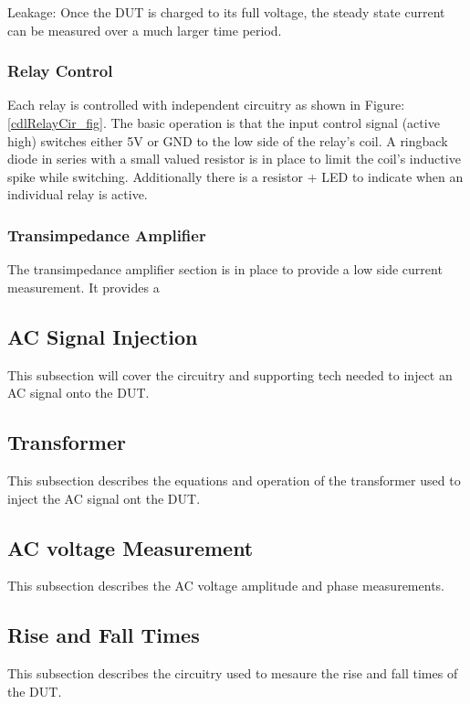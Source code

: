 Leakage:
Once the DUT is charged to its full voltage, the steady state current can be measured over a much larger time period.

\subsubsection{Relay Control}

Each relay is controlled with independent circuitry as shown in Figure: \ref{cdlRelayCir_fig}. The basic operation is that the input control signal (active high) switches either 5V or GND to the low side of the relay's coil. A ringback diode in series with a small valued resistor is in place to limit the coil's inductive spike while switching. Additionally there is a resistor + LED to indicate when an individual relay is active.

\subsubsection{Transimpedance Amplifier}
The transimpedance amplifier section is in place to provide a low side current measurement. It provides a 


\subsection {AC Signal Injection}

This subsection will cover the circuitry and supporting tech needed to inject an AC signal onto the DUT.

\subsection {Transformer}

This subsection describes the equations and operation of the transformer used to inject the AC signal ont the DUT.

\subsection {AC voltage Measurement}

This subsection describes the AC voltage amplitude and phase measurements. 

\subsection {Rise and Fall Times}

This subsection describes the circuitry used to mesaure the rise and fall times of the DUT.

